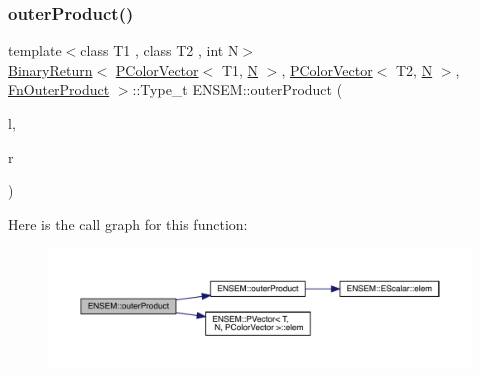 \subsubsection{\texorpdfstring{outerProduct()}{outerProduct()}}
{\footnotesize\ttfamily template$<$class T1 , class T2 , int N$>$ \\
\mbox{\hyperlink{structENSEM_1_1BinaryReturn}{Binary\+Return}}$<$ \mbox{\hyperlink{classENSEM_1_1PColorVector}{P\+Color\+Vector}}$<$ T1, \mbox{\hyperlink{operator__name__util_8cc_a7722c8ecbb62d99aee7ce68b1752f337}{N}} $>$, \mbox{\hyperlink{classENSEM_1_1PColorVector}{P\+Color\+Vector}}$<$ T2, \mbox{\hyperlink{operator__name__util_8cc_a7722c8ecbb62d99aee7ce68b1752f337}{N}} $>$, \mbox{\hyperlink{structENSEM_1_1FnOuterProduct}{Fn\+Outer\+Product}} $>$\+::Type\+\_\+t E\+N\+S\+E\+M\+::outer\+Product (\begin{DoxyParamCaption}\item[{const \mbox{\hyperlink{classENSEM_1_1PColorVector}{P\+Color\+Vector}}$<$ T1, \mbox{\hyperlink{operator__name__util_8cc_a7722c8ecbb62d99aee7ce68b1752f337}{N}} $>$ \&}]{l,  }\item[{const \mbox{\hyperlink{classENSEM_1_1PColorVector}{P\+Color\+Vector}}$<$ T2, \mbox{\hyperlink{operator__name__util_8cc_a7722c8ecbb62d99aee7ce68b1752f337}{N}} $>$ \&}]{r }\end{DoxyParamCaption})\hspace{0.3cm}{\ttfamily [inline]}}

Here is the call graph for this function\+:\nopagebreak
\begin{figure}[H]
\begin{center}
\leavevmode
\includegraphics[width=350pt]{dd/d2f/group__primcolormatrix_ga4f0b21163125568ab5bcbbef75a17973_cgraph}
\end{center}
\end{figure}
\mbox{\label{group__primcolormatrix_ga44a6b0393ecffb0c4aecc93b45a8d12d}} 
